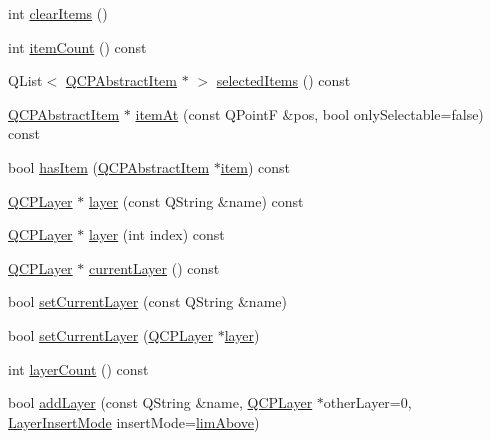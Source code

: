 \begin{DoxyCompactItemize}
int \mbox{\hyperlink{class_q_custom_plot_abdfd07d4f0591d0cf967f85013fd3645}{clear\+Items}} ()
\item 
int \mbox{\hyperlink{class_q_custom_plot_a16025daf0341f9362be3080e404424c2}{item\+Count}} () const
\item 
Q\+List$<$ \mbox{\hyperlink{class_q_c_p_abstract_item}{Q\+C\+P\+Abstract\+Item}} $\ast$ $>$ \mbox{\hyperlink{class_q_custom_plot_afda487bcf2d6cf1a57173d82495e29ba}{selected\+Items}} () const
\item 
\mbox{\hyperlink{class_q_c_p_abstract_item}{Q\+C\+P\+Abstract\+Item}} $\ast$ \mbox{\hyperlink{class_q_custom_plot_ac08578e0e6c059c83a8d340ba0038e8e}{item\+At}} (const Q\+PointF \&pos, bool only\+Selectable=false) const
\item 
bool \mbox{\hyperlink{class_q_custom_plot_af0b57f35646079f93fa6161a65b36109}{has\+Item}} (\mbox{\hyperlink{class_q_c_p_abstract_item}{Q\+C\+P\+Abstract\+Item}} $\ast$\mbox{\hyperlink{class_q_custom_plot_ac042f2e78edd228ccf2f26b7fe215239}{item}}) const
\item 
\mbox{\hyperlink{class_q_c_p_layer}{Q\+C\+P\+Layer}} $\ast$ \mbox{\hyperlink{class_q_custom_plot_a0a96244e7773b242ef23c32b7bdfb159}{layer}} (const Q\+String \&name) const
\item 
\mbox{\hyperlink{class_q_c_p_layer}{Q\+C\+P\+Layer}} $\ast$ \mbox{\hyperlink{class_q_custom_plot_acbb570f4c24306e7c2324d40bfe157c2}{layer}} (int index) const
\item 
\mbox{\hyperlink{class_q_c_p_layer}{Q\+C\+P\+Layer}} $\ast$ \mbox{\hyperlink{class_q_custom_plot_a0421d647f420b0b4c57aec1708857af5}{current\+Layer}} () const
\item 
bool \mbox{\hyperlink{class_q_custom_plot_a73a6dc47c653bb6f8f030abca5a11852}{set\+Current\+Layer}} (const Q\+String \&name)
\item 
bool \mbox{\hyperlink{class_q_custom_plot_a23a4d3cadad1a0063c5fe19aac5659e6}{set\+Current\+Layer}} (\mbox{\hyperlink{class_q_c_p_layer}{Q\+C\+P\+Layer}} $\ast$\mbox{\hyperlink{class_q_custom_plot_a0a96244e7773b242ef23c32b7bdfb159}{layer}})
\item 
int \mbox{\hyperlink{class_q_custom_plot_afa45d61e65292026f4c58c9c88c2cef0}{layer\+Count}} () const
\item 
bool \mbox{\hyperlink{class_q_custom_plot_ad5255393df078448bb6ac83fa5db5f52}{add\+Layer}} (const Q\+String \&name, \mbox{\hyperlink{class_q_c_p_layer}{Q\+C\+P\+Layer}} $\ast$other\+Layer=0, \mbox{\hyperlink{class_q_custom_plot_a75a8afbe6ef333b1f3d47abb25b9add7}{Layer\+Insert\+Mode}} insert\+Mode=\mbox{\hyperlink{class_q_custom_plot_a75a8afbe6ef333b1f3d47abb25b9add7a062b0b7825650b432a713c0df6742d41}{lim\+Above}})

\end{DoxyCompactItemize}
